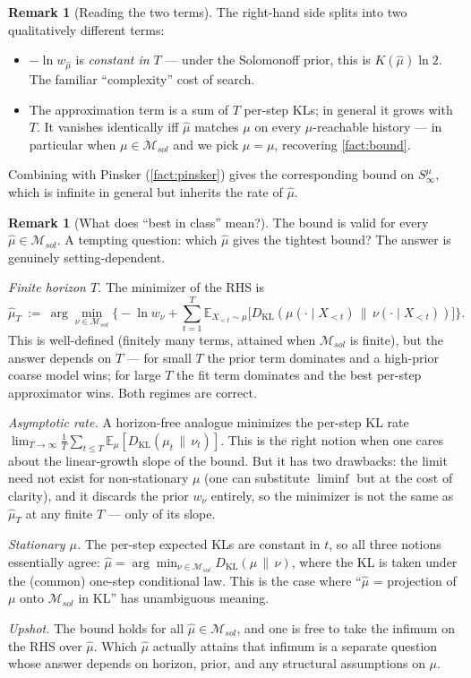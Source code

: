 \documentclass[fontsize=11pt, parskip=half]{scrartcl}
\theoremstyle{definition}
\newtheorem{remark}[theorem]{Remark}
\newcommand{\Msol}{\mathcal{M}_{sol}}
\begin{document}
\begin{remark}[Reading the two terms]
The right-hand side splits into two qualitatively different terms:
\begin{itemize}\itemsep=2pt
\item $-\ln w_{\hat\mu}$ is \emph{constant in $T$} --- under the Solomonoff
prior, this is $K(\hat\mu)\ln 2$. The familiar ``complexity'' cost of search.
\item The approximation term is a sum of $T$ per-step KLs; in general it
grows with $T$. It vanishes identically iff $\hat\mu$ matches $\mu$ on every
$\mu$-reachable history --- in particular when $\mu \in \Msol$ and we pick
$\hat\mu = \mu$, recovering \cref{fact:bound}.
\end{itemize}
Combining with Pinsker (\cref{fact:pinsker}) gives the corresponding bound on
$S^\mu_\infty$, which is infinite in general but inherits the rate of $\hat\mu$.
\end{remark}

\begin{remark}[What does ``best in class'' mean?]
The bound is valid for every $\hat\mu \in \Msol$. A tempting question: which
$\hat\mu$ gives the tightest bound? The answer is genuinely setting-dependent.

\textit{Finite horizon $T$.} The minimizer of the RHS is
\[
  \hat\mu_T ~:=~ \arg\min_{\nu \in \Msol}\!
    \Big\{ -\ln w_\nu + \textstyle\sum_{t=1}^{T} \mathbb{E}_{X_{<t} \sim \mu}\!
    \big[ D_{\text{KL}}(\mu(\cdot \mid X_{<t}) \,\|\, \nu(\cdot \mid X_{<t})) \big] \Big\}.
\]
This is well-defined (finitely many terms, attained when $\Msol$ is finite),
but the answer depends on $T$ --- for small $T$ the prior term dominates and a
high-prior coarse model wins; for large $T$ the fit term dominates and the best
per-step approximator wins. Both regimes are correct.

\textit{Asymptotic rate.} A horizon-free analogue minimizes the per-step KL
rate $\lim_{T \to \infty} \tfrac{1}{T} \sum_{t \leq T}
\mathbb{E}_\mu[D_{\text{KL}}(\mu_t \,\|\, \nu_t)]$. This is the right notion
when one cares about the linear-growth slope of the bound. But it has two
drawbacks: the limit need not exist for non-stationary $\mu$ (one can
substitute $\liminf$ but at the cost of clarity), and it discards the prior
$w_\nu$ entirely, so the minimizer is not the same as $\hat\mu_T$ at any finite
$T$ --- only of its slope.

\textit{Stationary $\mu$.} The per-step expected KLs are constant in $t$, so
all three notions essentially agree: $\hat\mu = \arg\min_{\nu \in \Msol}
D_{\text{KL}}(\mu \,\|\, \nu)$, where the KL is taken under the (common)
one-step conditional law. This is the case where ``$\hat\mu$ = projection of
$\mu$ onto $\Msol$ in KL'' has unambiguous meaning.

\textit{Upshot.} The bound holds for all $\hat\mu \in \Msol$, and one is free
to take the infimum on the RHS over $\hat\mu$. Which $\hat\mu$ actually
attains that infimum is a separate question whose answer depends on horizon,
prior, and any structural assumptions on $\mu$.
\end{remark}
\end{document}
